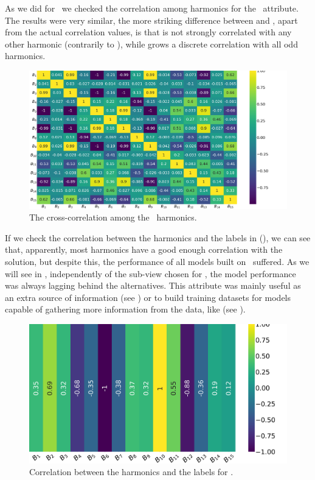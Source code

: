 As we did for \an\ we checked the correlation among harmonics for the \bn\ attribute. The results
were very similar, the more striking difference between  and ,
apart from the actual correlation values, is that \bn[2] is not strongly correlated with any other
harmonic (contrarily to \an[2]), while \bn[15] grows a discrete correlation with all odd harmonics.
\begin{figure}[!hb]
	\centering
	\includegraphics[width=\linewidth]{img/Bn_corr_matrix.png}
	\caption{The cross-correlation among the \bn\ harmonics.} \label{fig:bn-corr}
\end{figure}

If we check the correlation between the harmonics and the labels in (), we can see
that, apparently, most harmonics have a good enough correlation with the solution, but despite this, the performance of all
models built on \bn\ suffered. As we will see in , independently of the sub-view chosen for \bn, the model
performance was always lagging behind the alternatives. This attribute was mainly useful as an extra
source of information (see ) or to build training datasets for models capable of
gathering more information from the data, like \rfs (see ).
\begin{figure}[!hb]
	\centering
	\includegraphics[width=0.7\linewidth]{img/Bn_label_corr.png}
	\caption{Correlation between the harmonics and the labels for \bn.} \label{fig:bn-lcorr}
\end{figure}


